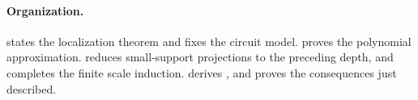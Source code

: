 \paragraph{Organization.}
 states the localization theorem and fixes the
circuit model.  proves the polynomial approximation.
 reduces small-support projections to the preceding
depth, and  completes the finite scale induction.
 derives , and
 proves the consequences just described.
